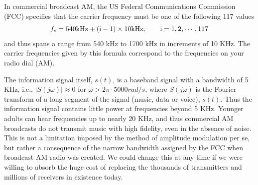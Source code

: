 \documentclass[a4paper]{article}
\begin{document}
In commercial broadcast AM, the US Federal Communications Commission (FCC) specifies that the carrier frequency must be one of the following 117 values
$$f_c=540\rm{kHz}+(i-1)\times10\rm{kHz},\qquad i=1,2,\cdots,117$$
and thus spans a range from 540 kHz to 1700 kHz in increments of 10 KHz. The carrier frequencies given by this formula correspond to the frequencies on your radio dial (AM).

The information signal itself, $s(t)$, is a baseband signal with a bandwidth of 5 KHz, i.e., $| S(j\omega) | \approx 0$ for $\omega > 2\pi \cdot 5000 rad/s$, where $S(j\omega)$ is the Fourier transform of a long segment of the signal (music, data or voice), $s(t)$. Thus the information signal contains little power at frequencies beyond 5 KHz. Younger adults can hear frequencies up to nearly 20 KHz, and thus commercial AM broadcasts do not transmit music with high fidelity, even in the absence of noise. This is not a limitation imposed by the method of amplitude modulation per se, but rather a consequence of the narrow bandwidth assigned by the FCC when broadcast
AM radio was created. We could change this at any time if we were willing to absorb the huge cost of replacing the thousands of transmitters and millions of receivers in existence today.
\end{document}
